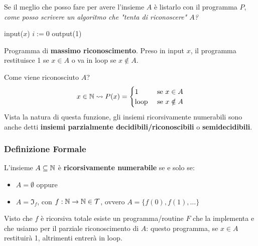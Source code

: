 Se il meglio che posso fare per avere l'insieme $A$ è listarlo con il programma $P$, \textit{come posso scrivere un algoritmo che "tenta di riconoscere" $A$?}

\vspace{0.5em}
\hspace{4em}
\begin{minipage}{.3\textwidth}
	\begin{tcolorbox}[
		colback=white,
		sharp corners,
		boxrule=.3mm,
		boxsep=0pt,
		left=20pt
		]
		\begin{algorithm}[H]
			\SetAlgoNoEnd
			input($x$)\;
			$i:=0$\;
			output(1)\;
		\end{algorithm}
	\end{tcolorbox}
\end{minipage}
\hspace{2em}
\begin{minipage}{.55\textwidth}
	Programma di \textbf{massimo riconoscimento}. Preso in input $x$, il programma restituisce 1 se $x\in A$ o va in loop se $x\notin A$.
\end{minipage}\vspace{0.5em}

Come viene riconosciuto $A$?
$$ x \in \mathbb{N} \rightsquigarrow P(x) = \begin{cases}
	1 & \text{ se } x \in A \\
	\text{loop} & \text{ se } x \notin A
\end{cases}$$
Vista la natura di questa funzione, gli insiemi ricorsivamente numerabili sono anche detti \textbf{insiemi parzialmente decidibili/riconoscibili} o \textbf{semidecidibili}.

\subsubsection{Definizione Formale}
L'insieme $A \subseteq \mathbb{N}$ è \textbf{ricorsivamente numerabile} se e solo se:
\begin{itemize}
	\item $A = \emptyset$ oppure
	\item $A = \Im_f$, con $f: \mathbb{N} \rightarrow \mathbb{N} \in \mathcal{T}$, ovvero $A = \{f(0), f(1), \dots\}$
\end{itemize}

Visto che $f$ è ricorsiva totale esiste un programma/routine $F$ che la implementa e che usiamo per il parziale riconoscimento di $A$: questo programma, se $x \in A$ restituirà 1, altrimenti entrerà in loop.

